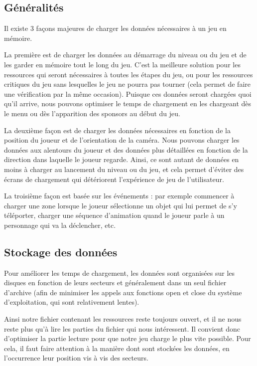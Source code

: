 \documentclass[a4paper, 11pt]{article} %
\begin{document}
\subsection{Généralités}
Il existe 3 façons majeures de charger les données nécessaires à un jeu en mémoire.

La première est de charger les données au démarrage du niveau ou du jeu et de les garder en mémoire tout le long du jeu. C'est la meilleure solution pour les ressources qui seront nécessaires à toutes les étapes du jeu, ou pour les ressources critiques du jeu sans lesquelles le jeu ne pourra pas tourner (cela permet de faire une vérification par la même occasion). Puisque ces données seront chargées quoi qu'il arrive, nous pouvons optimiser le temps de chargement en les chargeant dès le menu ou dès l'apparition des sponsors au début du jeu.

La deuxième façon est de charger les données nécessaires en fonction de la position du joueur et de l'orientation de la caméra. Nous pouvons charger les données aux alentours du joueur et des données plus détaillées en fonction de la direction dans laquelle le joueur regarde. Ainsi, ce sont autant de données en moins à charger au lancement du niveau ou du jeu, et cela permet d'éviter des écrans de chargement qui détériorent l’expérience de jeu de l'utilisateur.

La troisième façon est basée sur les événements : par exemple commencer à charger une zone lorsque le joueur sélectionne un objet qui lui permet de s'y téléporter, charger une séquence d'animation quand le joueur parle à un personnage qui va la déclencher, etc.

\newpage
\subsection{Stockage des données}
Pour améliorer les temps de chargement, les données sont organisées sur les disques en fonction de leurs secteurs et généralement dans un seul fichier d'archive (afin de minimiser les appels aux fonctions open et close du système d'exploitation, qui sont relativement lentes).


Ainsi notre fichier contenant les ressources reste toujours ouvert, et il ne nous reste plus qu'à lire les parties du fichier qui nous intéressent. Il convient donc d'optimiser la partie lecture pour que notre jeu charge le plus vite possible. Pour cela, il faut faire attention à la manière dont sont stockées les données, en l’occurrence leur position vis à vis des secteurs.
\end{document}
